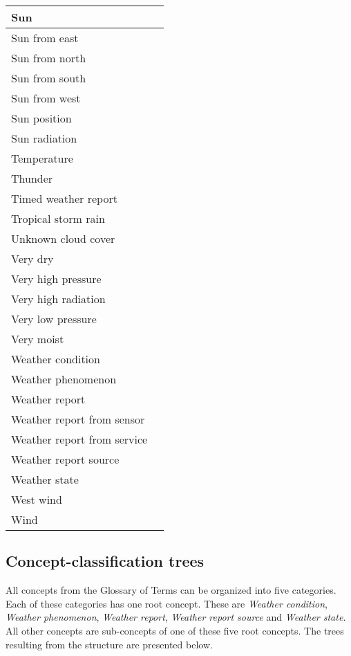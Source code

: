\begin{longtable}{|p{}|p{}|}
  \hline
  Sun & \\
  \hline
  Sun from east & \\
  \hline
  Sun from north & \\
  \hline
  Sun from south & \\
  \hline
  Sun from west & \\
  \hline
  Sun position & \\
  \hline
  Sun radiation & \\
  \hline
  Temperature & \\
  \hline
  Thunder & \\
  \hline
  Timed weather report & \\
  \hline
  Tropical storm rain & \\
  \hline
  Unknown cloud cover & \\
  \hline
  Very dry & \\
  \hline
  Very high pressure & \\
  \hline
  Very high radiation & \\
  \hline
  Very low pressure & \\
  \hline
  Very moist & \\
  \hline
  Weather condition & \\
  \hline
  Weather phenomenon & \\
  \hline
  Weather report & \\
  \hline
  Weather report from sensor & \\
  \hline
  Weather report from service & \\
  \hline
  Weather report source & \\
  \hline
  Weather state & \\
  \hline
  West wind & \\
  \hline
  Wind & \\
  \hline
\end{longtable}

\subsection{Concept-classification trees}
\label{sec:concept_classification_trees}

All concepts from the Glossary of Terms can be organized into five categories. Each of these categories has one root concept. These are \emph{Weather condition}, \emph{Weather phenomenon}, \emph{Weather report}, \emph{Weather report source} and \emph{Weather state}. All other concepts are sub-concepts of one of these five root concepts. The trees resulting from the structure are presented below.

